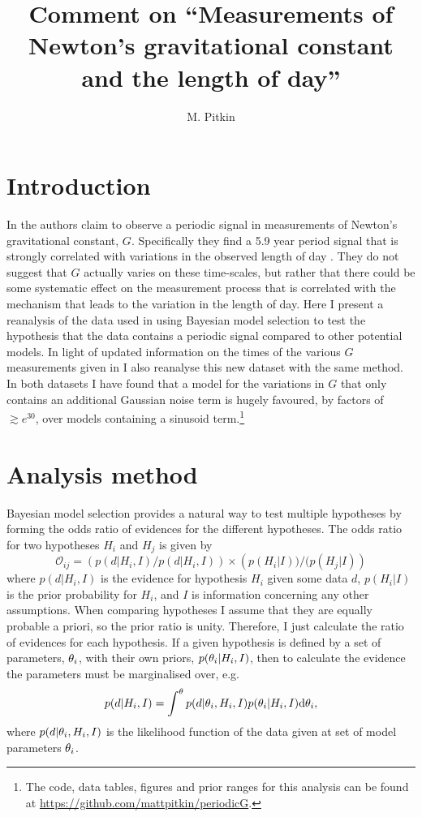 \documentclass[doublecol]{epl2}
\title{Comment on ``Measurements of Newton's gravitational constant and the length of day''}
\author{M. Pitkin}
\institute{
  SUPA, School of Physics \& Astronomy, University of Glasgow, Glasgow, G12 8QQ, UK
}
\begin{document}
\maketitle

\section{Introduction}

In \cite{2015EL....11010002A} the authors claim to observe a periodic signal in measurements of
Newton's gravitational constant, $G$. Specifically they find a 5.9 year period signal that
is strongly correlated with variations in the observed length of day
\cite{2013Natur.499..202H}. They do not suggest that $G$ actually varies on these
time-scales, but rather that there could be some systematic effect on the measurement process that is
correlated with the mechanism that leads to the variation in the length of day.
Here I present a reanalysis of the data used in \cite{2015EL....11010002A}
using Bayesian model selection to test the hypothesis that the data contains
a periodic signal compared to other potential models. In light of updated information on the times
of the various $G$ measurements given in \cite{2015arXiv150501774S} I also reanalyse this new dataset with
the same method. In both datasets I have found that a model for the variations in $G$ that only contains an
additional Gaussian noise term is hugely favoured, by factors of $\gtrsim e^{30}$, over models containing
a sinusoid term.\footnote{The code, data tables, figures and prior ranges for this analysis can be
found at \url{https://github.com/mattpitkin/periodicG}.}

\section{Analysis method}

Bayesian model selection provides a natural way to test multiple hypotheses by forming the odds ratio of
evidences for the different hypotheses. The odds ratio for two hypotheses $H_i$ and $H_j$ is given by
\begin{equation}
 \mathcal{O}_{ij} = \left(p(d|H_i,I)/p(d|H_i,I)\right)\times\left(p(H_i|I))/(p(H_j|I)\right)
\end{equation}
where $p(d|H_i,I)$ is the evidence for hypothesis $H_i$ given some data $d$,
$p(H_i|I)$ is the prior probability for $H_i$, and $I$ is information concerning any other assumptions.
When comparing hypotheses I assume that they are equally
probable a priori, so the prior ratio is unity. Therefore, I just calculate
the ratio of evidences for each hypothesis. If a given hypothesis is defined
by a set of parameters, $\mathbf{\theta}_i$, with their own priors,
$p(\mathbf{\theta}_i|H_i,I)$, then to calculate the evidence the parameters must be marginalised
over, e.g.\
\begin{equation}\label{eq:evidence}
 p(d|H_i,I) = \int^{\mathbf{\theta}} p(d|\mathbf{\theta}_i,H_i,I) p(\mathbf{\theta}_i|H_i,I) {\rm d}\mathbf{\theta}_i,
\end{equation}
where $p(d|\mathbf{\theta}_i,H_i,I)$ is the likelihood function of the data given at set of model parameters $\mathbf{\theta}_i$.
\end{document}
